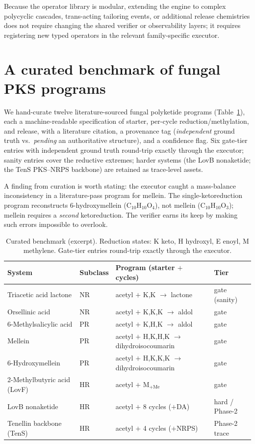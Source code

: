 \documentclass[11pt]{article}
\theoremstyle{definition}
\begin{document}
Because the operator library is modular, extending the engine to complex polycyclic cascades,
trans-acting tailoring events, or additional release chemistries does not require changing the
shared verifier or observability layers; it requires registering new typed operators in the
relevant family-specific executor.

\section{A curated benchmark of fungal PKS programs}
\label{sec:benchmark}

We hand-curate twelve literature-sourced fungal polyketide programs (Table~\ref{tab:bench}),
each a machine-readable specification of starter, per-cycle reduction/methylation, and release,
with a literature citation, a provenance tag (\emph{independent} ground truth vs.\ \emph{pending}
an authoritative structure), and a confidence flag. Six gate-tier entries with independent
ground truth round-trip exactly through the executor; sanity entries cover the reductive
extremes; harder systems (the LovB nonaketide; the TenS PKS--NRPS backbone) are retained as
trace-level assets.

A finding from curation is worth stating: the executor caught a mass-balance inconsistency in a
literature-pass program for mellein. The single-ketoreduction program reconstructs
6-hydroxymellein ($\mathrm{C_{10}H_{10}O_4}$), not mellein ($\mathrm{C_{10}H_{10}O_3}$); mellein
requires a \emph{second} ketoreduction. The verifier earns its keep by making such errors
impossible to overlook.

\begin{table}[t]
\centering\small
\caption{Curated benchmark (excerpt). Reduction states: K keto, H hydroxyl, E enoyl, M
methylene. Gate-tier entries round-trip exactly through the executor.}
\label{tab:bench}
\begin{tabular}{@{}llll@{}}
\toprule
System & Subclass & Program (starter $+$ cycles) & Tier \\
\midrule
Triacetic acid lactone & NR & acetyl $+$ K,K $\to$ lactone & gate (sanity) \\
Orsellinic acid        & NR & acetyl $+$ K,K,K $\to$ aldol  & gate \\
6-Methylsalicylic acid & PR & acetyl $+$ K,H,K $\to$ aldol  & gate \\
Mellein                & PR & acetyl $+$ H,K,H,K $\to$ dihydroisocoumarin & gate \\
6-Hydroxymellein       & PR & acetyl $+$ H,K,K,K $\to$ dihydroisocoumarin & gate \\
2-Methylbutyric acid (LovF) & HR & acetyl $+$ M$_{\text{+Me}}$ & gate \\
LovB nonaketide        & HR & acetyl $+$ 8 cycles ($+$DA) & hard / Phase-2 \\
Tenellin backbone (TenS) & HR & acetyl $+$ 4 cycles ($+$NRPS) & Phase-2 trace \\
\bottomrule
\end{tabular}
\end{table}
\end{document}
